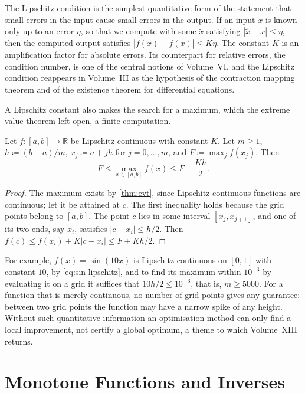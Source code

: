 The Lipschitz condition is the simplest quantitative form of the statement that small errors in the input cause small errors in the output. If an input $x$ is known only up to an error $\eta$, so that we compute with some $\tilde x$ satisfying $|\tilde x-x|\le\eta$, then the computed output satisfies $|f(\tilde x)-f(x)|\le K\eta$. The constant $K$ is an amplification factor for absolute errors. Its counterpart for relative errors, the condition number, is one of the central notions of Volume~VI, and the Lipschitz condition reappears in Volume~III as the hypothesis of the contraction mapping theorem and of the existence theorem for differential equations.

A Lipschitz constant also makes the search for a maximum, which the extreme value theorem left open, a finite computation.

\begin{proposition}
\label{prop:grid-max}
Let $f\colon[a,b]\to\mathbb R$ be Lipschitz continuous with constant $K$. Let $m\ge1$, $h\coloneqq(b-a)/m$, $x_j\coloneqq a+jh$ for $j=0,\ldots,m$, and $F\coloneqq\max_jf(x_j)$. Then
\[
F\le\max_{x\in[a,b]}f(x)\le F+\frac{Kh}2 .
\]
\end{proposition}

\begin{proof}
The maximum exists by \cref{thm:evt}, since Lipschitz continuous functions are continuous; let it be attained at $c$. The first inequality holds because the grid points belong to $[a,b]$. The point $c$ lies in some interval $[x_j,x_{j+1}]$, and one of its two ends, say $x_i$, satisfies $|c-x_i|\le h/2$. Then $f(c)\le f(x_i)+K|c-x_i|\le F+Kh/2$.
\end{proof}

For example, $f(x)=\sin(10x)$ is Lipschitz continuous on $[0,1]$ with constant $10$, by \eqref{eq:sin-lipschitz}, and to find its maximum within $10^{-3}$ by evaluating it on a grid it suffices that $10h/2\le10^{-3}$, that is, $m\ge5000$. For a function that is merely continuous, no number of grid points gives any guarantee: between two grid points the function may have a narrow spike of any height. Without such quantitative information an optimisation method can only find a local improvement, not certify a global optimum, a theme to which Volume~XIII returns.

\section{Monotone Functions and Inverses}
\label{sec:monotone-functions}

